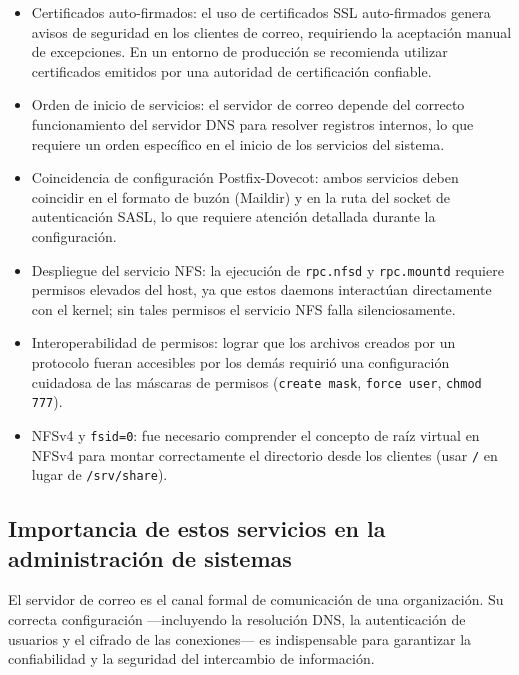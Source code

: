 \begin{itemize}
  \item Certificados auto-firmados: el uso de certificados SSL
        auto-firmados genera avisos de seguridad en los clientes de correo,
        requiriendo la aceptación manual de excepciones. En un entorno de
        producción se recomienda utilizar certificados emitidos por una
        autoridad de certificación confiable.
  \item Orden de inicio de servicios: el servidor de correo depende
        del correcto funcionamiento del servidor DNS para resolver registros
        internos, lo que requiere un orden específico en el inicio de los
        servicios del sistema.
  \item Coincidencia de configuración Postfix-Dovecot: ambos
        servicios deben coincidir en el formato de buzón (Maildir) y en la
        ruta del socket de autenticación SASL, lo que requiere atención
        detallada durante la configuración.
  \item Despliegue del servicio NFS: la ejecución de
        \texttt{rpc.nfsd} y \texttt{rpc.mountd} requiere permisos elevados del
        host, ya que estos daemons interactúan directamente con el kernel;
        sin tales permisos el servicio NFS falla silenciosamente.
  \item Interoperabilidad de permisos: lograr que los archivos
        creados por un protocolo fueran accesibles por los demás requirió una
        configuración cuidadosa de las máscaras de permisos
        (\texttt{create mask}, \texttt{force user}, \texttt{chmod 777}).
  \item NFSv4 y \texttt{fsid=0}: fue necesario comprender el concepto
        de raíz virtual en NFSv4 para montar correctamente el directorio desde
        los clientes (usar \texttt{/} en lugar de \texttt{/srv/share}).
\end{itemize}

\subsection{Importancia de estos servicios en la administración de sistemas}

El servidor de correo es el canal formal de comunicación de una organización.
Su correcta configuración —incluyendo la resolución DNS, la autenticación de
usuarios y el cifrado de las conexiones— es indispensable para garantizar la
confiabilidad y la seguridad del intercambio de información.

